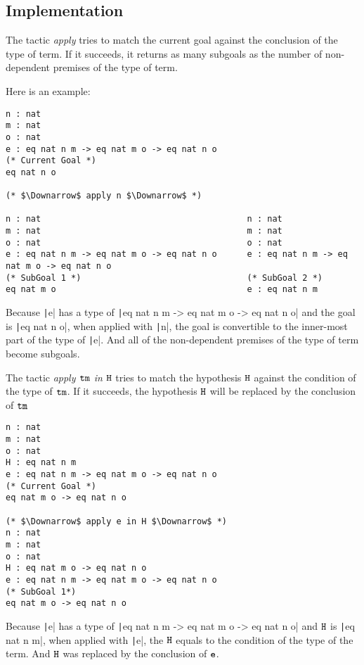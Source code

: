 \subsection*{Implementation}
The tactic {\it apply} tries to match the current goal against the 
conclusion of the type of term. 
If it succeeds, it returns as many subgoals as 
the number of non-dependent premises of the type of term.\par
Here is an example:
\begin{center}
\begin{verbatim}
n : nat
m : nat
o : nat
e : eq nat n m -> eq nat m o -> eq nat n o                  
(* Current Goal *)      
eq nat n o                        

(* $\Downarrow$ apply n $\Downarrow$ *)   

n : nat                                         n : nat                                       
m : nat                                         m : nat                                   
o : nat                                         o : nat                                   
e : eq nat n m -> eq nat m o -> eq nat n o      e : eq nat n m -> eq nat m o -> eq nat n o       
(* SubGoal 1 *)                                 (* SubGoal 2 *)          
eq nat m o                                      e : eq nat n m
\end{verbatim}
\end{center}
Because \texttt|e| has a type of \texttt|eq nat n m -> eq nat m o -> eq nat n o| 
and the goal is \texttt|eq nat n o|,
when applied with \texttt|n|,
the goal is convertible to the inner-most part of the type of \texttt|e|.
And all of the non-dependent premises of the type of term become subgoals.

The tactic {\it apply $\tt tm$ in $\tt H$} tries to match the hypothesis $\tt H$ against the 
condition of the type of $\tt tm$. 
If it succeeds, the hypothesis $\tt H$ will be replaced by the conclusion of $\tt tm$
\begin{center}
\begin{verbatim}
n : nat
m : nat
o : nat
H : eq nat n m 
e : eq nat n m -> eq nat m o -> eq nat n o                  
(* Current Goal *)      
eq nat m o -> eq nat n o                                        

(* $\Downarrow$ apply e in H $\Downarrow$ *)
n : nat                                                                         
m : nat                                                                     
o : nat  
H : eq nat m o -> eq nat n o
e : eq nat n m -> eq nat m o -> eq nat n o
(* SubGoal 1*)                                            
eq nat m o -> eq nat n o                                      
\end{verbatim}
\end{center}
Because \texttt|e| has a type of \texttt|eq nat n m -> eq nat m o -> eq nat n o| 
and $\tt H$ is \texttt|eq nat n m|,
when applied with \texttt|e|,
the $\tt H$ equals to the condition of the type of the term.
And $\tt H$ was replaced by the conclusion of $\tt e$.

